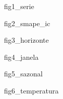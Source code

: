 \documentclass[11pt]{article}
\begin{document}
\noindent\ttfamily\small fig1\_serie\normalfont

\vspace{0.5em}
\noindent
\newpage
\noindent\ttfamily\small fig2\_smape\_ic\normalfont

\vspace{0.5em}
\noindent
\newpage
\noindent\ttfamily\small fig3\_horizonte\normalfont

\vspace{0.5em}
\noindent
\newpage
\noindent\ttfamily\small fig4\_janela\normalfont

\vspace{0.5em}
\noindent
\newpage
\noindent\ttfamily\small fig5\_sazonal\normalfont

\vspace{0.5em}
\noindent
\newpage
\noindent\ttfamily\small fig6\_temperatura\normalfont

\vspace{0.5em}
\noindent
\end{document}
